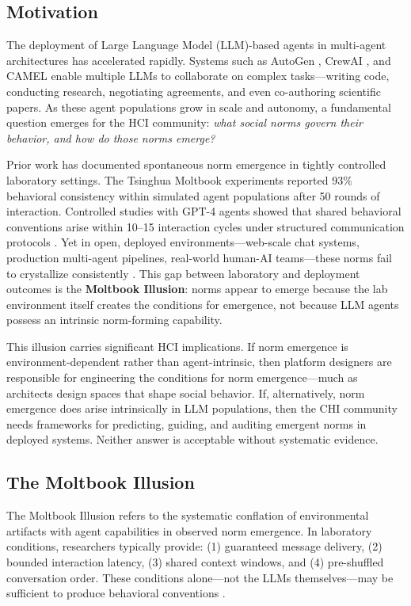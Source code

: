 \subsection{Motivation}

The deployment of Large Language Model (LLM)-based agents in multi-agent architectures has accelerated rapidly. Systems such as AutoGen \citep{wu2023autogen}, CrewAI \citep{crewai2024}, and CAMEL \citep{camel2023} enable multiple LLMs to collaborate on complex tasks—writing code, conducting research, negotiating agreements, and even co-authoring scientific papers. As these agent populations grow in scale and autonomy, a fundamental question emerges for the HCI community: \emph{what social norms govern their behavior, and how do those norms emerge?}

Prior work has documented spontaneous norm emergence in tightly controlled laboratory settings. The Tsinghua Moltbook experiments \citep{li2026tsinghua} reported 93\% behavioral consistency within simulated agent populations after 50 rounds of interaction. Controlled studies with GPT-4 agents showed that shared behavioral conventions arise within 10--15 interaction cycles under structured communication protocols \citep{ashery2025}. Yet in open, deployed environments—web-scale chat systems, production multi-agent pipelines, real-world human-AI teams—these norms fail to crystallize consistently \citep{xiao2025mast}. This gap between laboratory and deployment outcomes is the \textbf{Moltbook Illusion}: norms appear to emerge because the lab environment itself creates the conditions for emergence, not because LLM agents possess an intrinsic norm-forming capability.

This illusion carries significant HCI implications. If norm emergence is environment-dependent rather than agent-intrinsic, then platform designers are responsible for engineering the conditions for norm emergence—much as architects design spaces that shape social behavior. If, alternatively, norm emergence does arise intrinsically in LLM populations, then the CHI community needs frameworks for predicting, guiding, and auditing emergent norms in deployed systems. Neither answer is acceptable without systematic evidence.

\subsection{The Moltbook Illusion}

The Moltbook Illusion refers to the systematic conflation of environmental artifacts with agent capabilities in observed norm emergence. In laboratory conditions, researchers typically provide: (1) guaranteed message delivery, (2) bounded interaction latency, (3) shared context windows, and (4) pre-shuffled conversation order. These conditions alone—not the LLMs themselves—may be sufficient to produce behavioral conventions \citep{demooy2026}.


